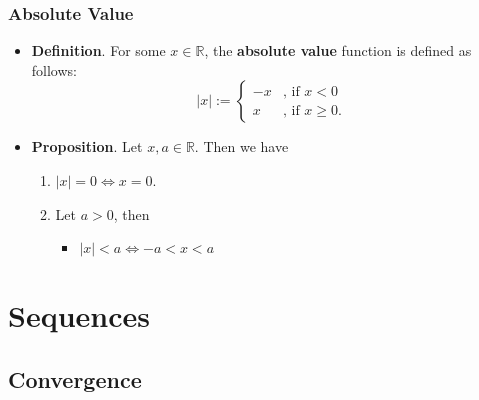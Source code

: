 \documentclass{article}
\newcommand{\R}{\mathbb{R}}
\newcommand{\?}{\stackrel{?}{=}}
\newcommand{\smallblacksquare}{\rule{0.5em}{0.5em}}
\begin{document}
\subsubsection{Absolute Value}

\begin{itemize}
    \item \textbf{Definition}. For some $x \in \R$, the \textbf{absolute value} function is defined as follows:
    \[ |x| := \begin{cases}
        -x & \text{, if } x < 0 \\
        x & \text{, if } x \geq 0.
    \end{cases} \]
    \item \textbf{Proposition}. Let $x, a \in \R$. Then we have
    \begin{enumerate}[label=(\roman*)]
        \item $|x| = 0 \iff x = 0$.
        \item Let $a > 0$, then
        \begin{itemize}[label=\smallblacksquare]
            \item $|x| < a \iff -a < x < a$
        \end{itemize}
    \end{enumerate}
\end{itemize}

\section{Sequences}

\subsection{Convergence}
\end{document}
